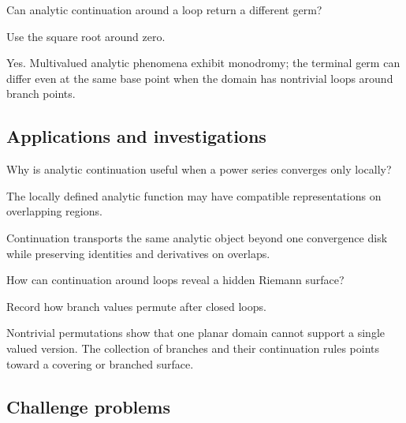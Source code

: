 \begin{exercise}\label{exr:iv15-expand-12}
Can analytic continuation around a loop return a different germ?
\end{exercise}
\begin{hint}
Use the square root around zero.
\end{hint}
\begin{solution}
Yes. Multivalued analytic phenomena exhibit monodromy; the terminal germ can differ even at the same base point when the domain has nontrivial loops around branch points.
\end{solution}

\subsection*{Applications and investigations}

\begin{exercise}\label{exr:iv15-expand-13}
Why is analytic continuation useful when a power series converges only locally?
\end{exercise}
\begin{hint}
The locally defined analytic function may have compatible representations on overlapping regions.
\end{hint}
\begin{solution}
Continuation transports the same analytic object beyond one convergence disk while preserving identities and derivatives on overlaps.
\end{solution}

\begin{exercise}\label{exr:iv15-expand-14}
How can continuation around loops reveal a hidden Riemann surface?
\end{exercise}
\begin{hint}
Record how branch values permute after closed loops.
\end{hint}
\begin{solution}
Nontrivial permutations show that one planar domain cannot support a single valued version. The collection of branches and their continuation rules points toward a covering or branched surface.
\end{solution}

\subsection*{Challenge problems}

